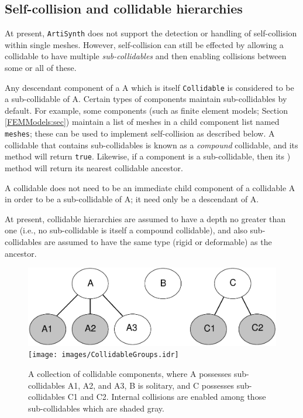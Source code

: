 \subsection{Self-collision and collidable hierarchies}
\label{SelfCollision:sec}

At present, {\tt ArtiSynth} does not support the detection or handling
of self-collision within single meshes. However, self-collision can
still be effected by allowing a collidable to have multiple {\it
sub-collidables} and then enabling collisions between some or all of
these. 

Any descendant component of a
 A which is itself
{\tt Collidable} is considered to be a sub-collidable of A.  Certain
types of components maintain sub-collidables by default.  For example,
some components (such as finite element models; Section
\ref{FEMModels:sec}) maintain a list of meshes in a child component
list named {\tt meshes}; these can be used to implement self-collision
as described below. A collidable that contains sub-collidables is
known as a {\it compound} collidable, and its
 method
will return {\tt true}. Likewise, if a component is a sub-collidable,
then its
)
method will return its nearest collidable ancestor.

\begin{sideblock}
A collidable does not need to be an immediate child component of a
collidable A in order to be a sub-collidable of A; it need only be a
descendant of A.
\end{sideblock}

\begin{sideblock}
At present, collidable hierarchies are assumed to have a depth no
greater than one (i.e., no sub-collidable is itself a compound
collidable), and also sub-collidables are assumed to have the same
type (rigid or deformable) as the ancestor.
\end{sideblock}

\begin{figure}[ht]
\begin{center}
 \iflatexml
   \includegraphics[width=5in]{images/CollidableGroups}
 \else
   \texttt{[image: images/CollidableGroups.idr]}
 \fi
\end{center}
\caption{A collection of collidable components, where A possesses
sub-collidables A1, A2, and A3, B is solitary, and C possesses
sub-collidables C1 and C2. Internal collisions are enabled among those
sub-collidables which are shaded gray.}
\label{CollidableGroups:fig}
\end{figure}

